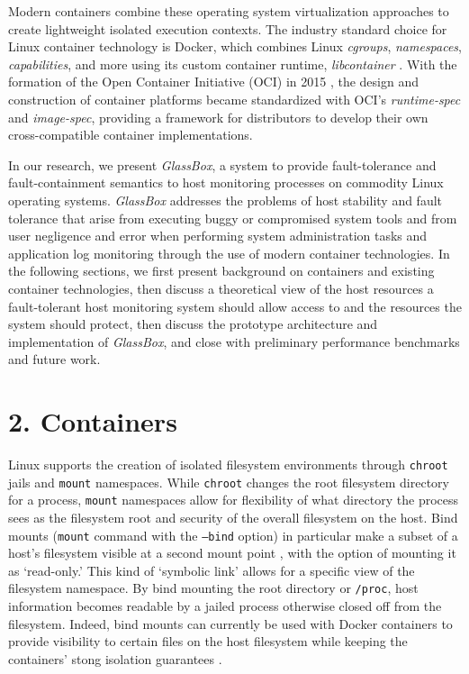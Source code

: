 \documentclass{proc}
\begin{document}
Modern containers combine these operating system virtualization approaches to create lightweight isolated execution contexts. The industry standard choice for Linux container technology is Docker, which combines Linux \textit{cgroups}, \textit{namespaces}, \textit{capabilities}, and more using its custom container runtime, \textit{libcontainer} \cite{hykes2014libcontainer}. With the formation of the Open Container Initiative (OCI) in 2015 \cite{opencontainerinitiative}, the design and construction of container platforms became standardized with OCI's \textit{runtime-spec} and \textit{image-spec}, providing a framework for distributors to develop their own cross-compatible container implementations.

In our research, we present \textit{GlassBox}, a system to provide fault-tolerance and fault-containment semantics to host monitoring processes on commodity Linux operating systems. \textit{GlassBox} addresses the problems of host stability and fault tolerance that arise from executing buggy or compromised system tools and from user negligence and error when performing system administration tasks and application log monitoring through the use of modern container technologies. In the following sections, we first present background on containers and existing container technologies, then discuss a theoretical view of the host resources a fault-tolerant host monitoring system should allow access to and the resources the system should protect, then discuss the prototype architecture and implementation of \textit{GlassBox}, and close with preliminary performance benchmarks and future work.

\section*{2. Containers}

Linux supports the creation of isolated filesystem environments through \texttt{chroot} jails and \texttt{mount} namespaces. While \texttt{chroot} changes the root filesystem directory for a process, \texttt{mount} namespaces allow for flexibility of what directory the process sees as the filesystem root and security of the overall filesystem on the host. Bind mounts (\texttt{mount} command with the \texttt{--bind} option) in particular make a subset of a host's filesystem visible at a second mount point \cite{bindmount}, with the option of mounting it as `read-only.' This kind of `symbolic link' allows for a specific view of the filesystem namespace. By bind mounting the root directory or \texttt{/proc}, host information becomes readable by a jailed process otherwise closed off from the filesystem. Indeed, bind mounts can currently be used with Docker containers to provide visibility to certain files on the host filesystem while keeping the containers' stong isolation guarantees \cite{dockerdoc}.
\end{document}
